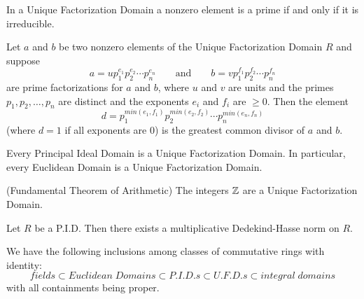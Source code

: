 \documentclass[../main]{subfiles}
\begin{document}
\begin{prop}
 In a Unique Factorization Domain a nonzero element is a prime if and only if it is irreducible.
\end{prop}


\begin{prop}
 Let $a$ and $b$ be two nonzero elements of the Unique Factorization Domain $R$ and suppose
 \[ a = u p_1^{e_1} p_2^{e_2} \cdots p_n^{e_n} \qquad \text{and} \qquad b = v p_1^{f_1} p_2^{f_2} \cdots p_n^{f_n} \]
 are prime factorizations for $a$ and $b$, where $u$ and $v$ are units and the primes $p_1, p_2, \ldots, p_n$ are distinct and the exponents $e_i$ and $f_i$ are $\geq 0$. Then the element 
 \[ d = p_1^{min(e_1, f_1)} p_2^{min(e_2, f_2)} \cdots p_n^{min(e_n, f_n)} \]
 (where $d=1$ if all exponents are 0) is the greatest common divisor of $a$ and $b$.
\end{prop}


\begin{thm}
 Every Principal Ideal Domain is a Unique Factorization Domain. In particular, every Euclidean Domain is a Unique Factorization Domain.
\end{thm}


\begin{cor}
 (Fundamental Theorem of Arithmetic) The integers $\mathbb{Z}$ are a Unique Factorization Domain.
\end{cor}


\begin{cor}
 Let $R$ be a P.I.D. Then there exists a multiplicative Dedekind-Hasse norm on $R$.
\end{cor}


\addtocounter{thm}{3}


\begin{nt}
 We have the following inclusions among classes of commutative rings with identity:
 \[ fields \subset Euclidean \; Domains \subset P.I.D.s \subset U.F.D.s \subset integral \; domains \]
 with all containments being proper.
\end{nt}
\end{document}
